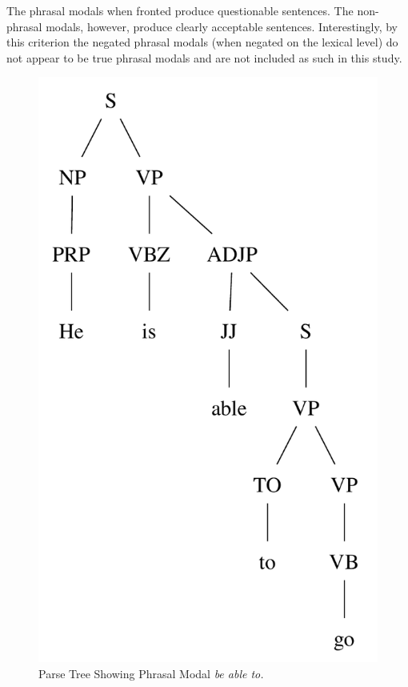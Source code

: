 \documentclass[main.tex]{subfiles}
\begin{document}
The phrasal modals when fronted produce questionable sentences. The non-phrasal modals, however, produce clearly acceptable sentences. Interestingly, by this criterion the negated phrasal modals (when negated on the lexical level) do not appear to be true phrasal modals and are not included as such in this study.
\begin{figure}[htbp]
\centering
\includegraphics[scale=0.6]{modal-able.pdf}
\caption{Parse Tree Showing Phrasal Modal \textit{be able to.}}
\label{fig:quasimodal-able}
\end{figure}
\end{document}
